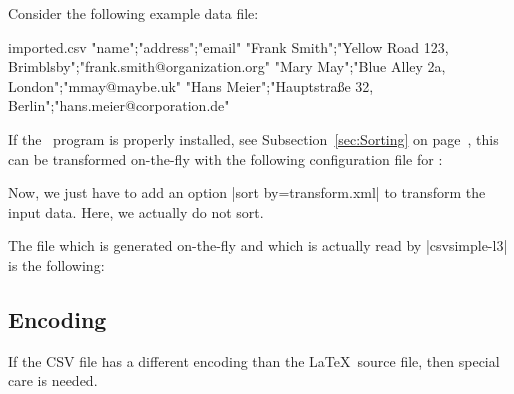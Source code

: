 \documentclass[a4paper,11pt]{ltxdoc}
\begin{document}
Consider the following example data file:

\begin{tcbverbatimwrite}{imported.csv}
"name";"address";"email"
"Frank Smith";"Yellow Road 123, Brimblsby";"frank.smith@organization.org"
"Mary May";"Blue Alley 2a, London";"mmay@maybe.uk"
"Hans Meier";"Hauptstraße 32, Berlin";"hans.meier@corporation.de"
\end{tcbverbatimwrite}


If the \csvsorter\ program is properly installed,
see Subsection~\ref{sec:Sorting} on page~\pageref{sec:Sorting},
this can be transformed on-the-fly
with the following configuration file for \csvsorter:


Now, we just have to add an option |sort by=transform.xml| to transform
the input data. Here, we actually do not sort.

\begin{dispExample}
\newcommand{\Header}[1]{\normalfont\bfseries #1}

\csvreader[
    sort by    = transform.xml,
    tabular    = >{\itshape}ll>{\ttfamily}l,
    table head = \toprule\Header{Name} & \Header{Address} & \Header{email}\\\midrule,
    table foot = \bottomrule
  ]
  {imported.csv}{}
  {\csvlinetotablerow}
\end{dispExample}

The file which is generated on-the-fly and which is actually read by
|csvsimple-l3| is the following:



\clearpage
\subsection{Encoding}\label{encoding}%
If the CSV file has a different encoding than the \LaTeX\ source file,
then special care is needed.
\end{document}
